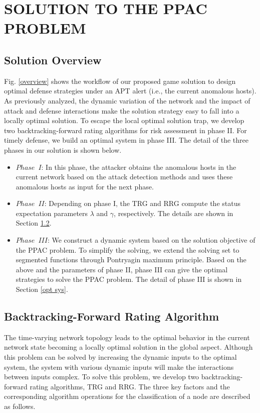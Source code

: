 \documentclass[lettersize,journal]{IEEEtran}
\begin{document}
\section{SOLUTION TO THE PPAC PROBLEM}



\subsection{Solution Overview}\label{view}
Fig. \ref{overview} shows the workflow of our proposed game solution to design optimal defense strategies under an APT alert (i.e., the current anomalous hosts). As previously analyzed, the dynamic variation of the network and the impact of attack and defense interactions make the solution strategy easy to fall into a locally optimal solution. To escape the local optimal solution trap, we develop two backtracking-forward rating algorithms for risk assessment in phase II. For timely defense, we build an optimal system in phase III. The detail of the three phases in our solution is shown below.
\begin{itemize}
    \item $Phase\enspace I$: In this phase, the attacker obtains the anomalous hosts in the current network based on the attack detection methods \cite{fang2022back,alsaheel2021atlas,tuor2017deep,milajerdi2019holmes,zengy2022shadewatcher} and uses these anomalous hosts as input for the next phase.  
    \item $Phase\enspace II$: Depending on phase I, the TRG and RRG compute the status expectation parameters $\lambda$ and $\gamma$, respectively. The details are shown in Section \ref{algorithm}.
    \item $Phase\enspace III$: We construct a dynamic system based on the solution objective of the PPAC problem. To simplify the solving, we extend the solving set to segmented functions through Pontryagin maximum principle. Based on the above and the parameters of phase II, phase III can give the optimal strategies to solve the PPAC problem. The detail of phase III is shown in Section \ref{opt sys}.
\end{itemize}


\subsection{Backtracking-Forward Rating Algorithm} \label{algorithm}
The time-varying network topology leads to the optimal behavior in the current network state becoming a locally optimal solution in the global aspect. Although this problem can be solved by increasing the dynamic inputs to the optimal system, the system with various dynamic inputs will make the interactions between inputs complex. To solve this problem, we develop two backtracking-forward rating algorithms, TRG and RRG. The three key factors and the corresponding algorithm operations for the classification of a node are described as follows. 
\end{document}
